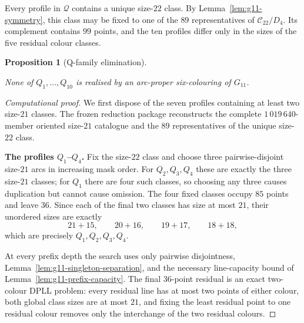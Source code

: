 \documentclass[11pt]{article}
\newtheorem{proposition}[theorem]{Proposition}
\theoremstyle{definition}
\theoremstyle{remark}
\newcommand{\Dfour}{D_4}
\begin{document}
Every profile in \(\mathcal Q\) contains a unique size-\(22\) class.  By
Lemma~\ref{lem:g11-symmetry}, this class may be fixed to one of the \(89\)
representatives of \(\mathcal C_{22}/\Dfour\).  Its complement contains
\(99\) points, and the ten profiles differ only in the sizes of the five
residual colour classes.

\begin{proposition}[Q-family elimination]\label{prop:g11-Q}

None of \(Q_1,\ldots,Q_{10}\) is realised by an arc-proper six-colouring of
\(G_{11}\).

\end{proposition}

\begin{proof}[Computational proof]
We first dispose of the seven profiles containing at least two size-\(21\)
classes.  The frozen reduction package reconstructs the complete
\(1\,019\,640\)-member oriented size-\(21\) catalogue and the \(89\)
representatives of the unique size-\(22\) class.

\medskip\noindent\textbf{The profiles \(Q_1\)--\(Q_4\).}\quad
Fix the size-\(22\) class and choose three pairwise-disjoint size-\(21\) arcs
in increasing mask order.  For \(Q_2,Q_3,Q_4\) these are exactly the three
size-\(21\) classes; for \(Q_1\) there are four such classes, so choosing any
three causes duplication but cannot cause omission.  The four fixed classes
occupy \(85\) points and leave \(36\).  Since each of the final two classes
has size at most \(21\), their unordered sizes are exactly
\[
  21+15,\qquad 20+16,\qquad 19+17,\qquad 18+18,
\]
which are precisely \(Q_1,Q_2,Q_3,Q_4\).

At every prefix depth the search uses only pairwise disjointness,
Lemma~\ref{lem:g11-singleton-separation}, and the necessary line-capacity
bound of Lemma~\ref{lem:g11-prefix-capacity}.  The final \(36\)-point
residual is an exact two-colour DPLL problem: every residual line has at most
two points of either colour, both global class sizes are at most \(21\), and
fixing the least residual point to one residual colour removes only the
interchange of the two residual colours.


\end{proof}
\end{document}
